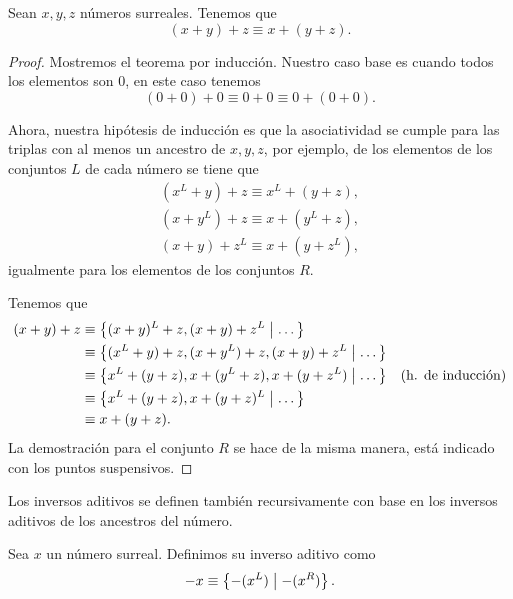     \begin{theorem}
        Sean $x, y, z$ n\'umeros surreales. Tenemos que
        \[
            (x+y)+z \equiv x+(y+z).
        \]
    \end{theorem}

    \begin{proof}
        Mostremos el teorema por inducci\'on. Nuestro caso base es cuando todos los elementos son $0$, en este caso tenemos
        \[
            (0+0)+0 \equiv 0+0 \equiv 0+(0+0).
        \]

        Ahora, nuestra hip\'otesis de inducci\'on es que la asociatividad se cumple para las triplas con al menos un ancestro de $x,y,z$, por ejemplo, de los elementos de los conjuntos $L$ de cada n\'umero se tiene que
        \begin{align*}
            (x^L+y)+z \equiv x^L + (y+z), \\
            (x+y^L)+z \equiv x + (y^L+z), \\
            (x+y)+z^L \equiv x + (y+z^L),
        \end{align*}
        igualmente para los elementos de los conjuntos $R$.

        Tenemos que
        \begin{align*}
            (x+y)+z & \equiv \left\{(x+y)^L+z, (x+y)+z^L\;\middle|\; \dots\right\} & \\
                    & \equiv \left\{(x^L+y)+z, (x+y^L)+z, (x+y)+z^L\;\middle|\; \dots\right\} & \\
                    & \equiv \left\{x^L+(y+z), x+(y^L+z), x+(y+z^L)\;\middle|\; \dots\right\} & \text{(h. de inducci\'on)}  \\
                    & \equiv \left\{x^L+(y+z), x+(y+z)^L\;\middle|\; \dots\right\} & \\
                    & \equiv x+(y+z). & 
        \end{align*}
        La demostraci\'on para el conjunto $R$ se hace de la misma manera, est\'a indicado con los puntos suspensivos.
    \end{proof}

    Los inversos aditivos se definen tambi\'en recursivamente con base en los inversos aditivos de los ancestros del n\'umero.

    \begin{definition}
        Sea $x$ un n\'umero surreal. Definimos su inverso aditivo como
        \[
            -x \equiv \left\{-(x^L)\;\middle|\; -(x^R)\right\}.
        \]
    \end{definition}

